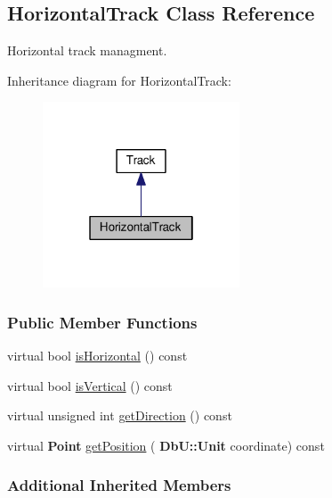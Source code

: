 \hypertarget{classKite_1_1HorizontalTrack}{}\subsection{Horizontal\+Track Class Reference}
\label{classKite_1_1HorizontalTrack}


Horizontal track managment.  




Inheritance diagram for Horizontal\+Track\+:\nopagebreak
\begin{figure}[H]
\begin{center}
\leavevmode
\includegraphics[width=166pt]{classKite_1_1HorizontalTrack__inherit__graph}
\end{center}
\end{figure}
\subsubsection*{Public Member Functions}
\begin{DoxyCompactItemize}
\item 
virtual bool \mbox{\hyperlink{classKite_1_1HorizontalTrack_a21b9cefd33ae22e4c2070ad441bdd30b}{is\+Horizontal}} () const
\item 
virtual bool \mbox{\hyperlink{classKite_1_1HorizontalTrack_abd54544ef1710ee4b67cfb021d73446c}{is\+Vertical}} () const
\item 
virtual unsigned int \mbox{\hyperlink{classKite_1_1HorizontalTrack_a0dd7cf705ace42c662c289955313b2e9}{get\+Direction}} () const
\item 
virtual \textbf{ Point} \mbox{\hyperlink{classKite_1_1HorizontalTrack_a6ab4f8026e4500918aa8721f1199f8b6}{get\+Position}} (\textbf{ Db\+U\+::\+Unit} coordinate) const
\end{DoxyCompactItemize}
\subsubsection*{Additional Inherited Members}


